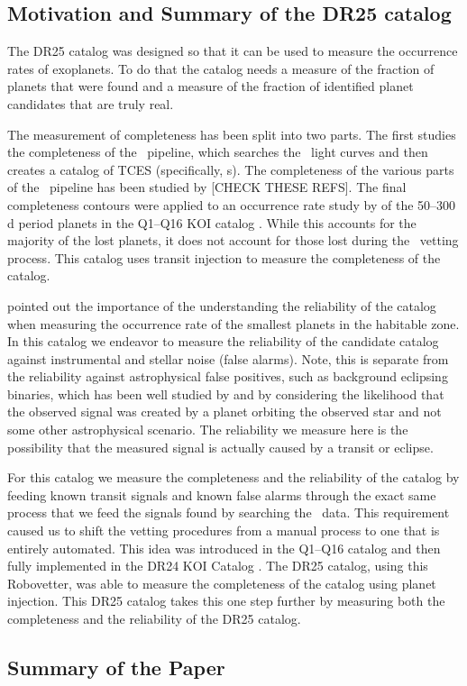 \subsection{Motivation and Summary of the DR25 catalog}

The DR25 catalog was designed so that it can be used to measure the occurrence rates of exoplanets. To do that the catalog needs a measure of the fraction of planets that were found and a measure of the fraction of identified planet candidates that are truly real.  

The measurement of completeness has been split into two parts. The first studies the completeness of the \Kepler\ pipeline, which searches the \Kepler\ light curves and then creates a catalog of TCES (specifically, \opstce s).  The completeness of the various parts of the \Kepler\ pipeline has been studied by \citep{Christiansen2015b,Christiansen2013a}[CHECK THESE REFS]. The final completeness contours were applied to an occurrence rate study by \citep{Burke2015} of the 50--300\,d period planets in the Q1--Q16 KOI catalog \citep{Mullally2015cat}. While this accounts for the majority of the lost planets, it does not account for those lost during the \opstce\ vetting process. This catalog uses transit injection to measure the completeness of the catalog.  

\citet{Burke2015} pointed out the importance of the understanding the reliability of the catalog when measuring the occurrence rate of the smallest planets in the habitable zone.  In this catalog we endeavor to measure the reliability of the candidate catalog against instrumental and stellar noise (false alarms).  Note, this is separate from the reliability against astrophysical false positives, such as background eclipsing binaries, which has been well studied by \citep{Morton2016} and \citet{Torres2012} by considering the likelihood that the observed signal was created by a planet orbiting the observed star and not some other astrophysical scenario.  The reliability we measure here is the possibility that the measured signal is actually caused by a transit or eclipse.

For this catalog we measure the completeness and the reliability of the catalog by feeding known transit signals and known false alarms through the exact same process that we feed the signals found by searching the \Kepler\ data.  This requirement caused us to shift the vetting procedures from a manual process to one that is entirely automated.  This idea was introduced in the Q1--Q16 catalog and then fully implemented in the DR24 KOI Catalog \citep{Coughlin2016}. The DR25 catalog, using this Robovetter, was able to measure the completeness of the catalog using planet injection. This DR25 catalog takes this one step further by measuring both the completeness and the reliability of the DR25 catalog.

\subsection{Summary of the Paper}